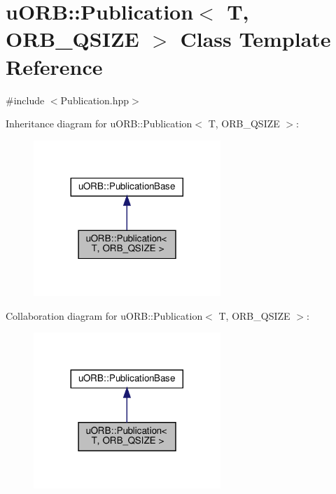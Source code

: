 \hypertarget{classuORB_1_1Publication}{}\section{u\+O\+RB\+:\+:Publication$<$ T, O\+R\+B\+\_\+\+Q\+S\+I\+ZE $>$ Class Template Reference}
\label{classuORB_1_1Publication}


{\ttfamily \#include $<$Publication.\+hpp$>$}



Inheritance diagram for u\+O\+RB\+:\+:Publication$<$ T, O\+R\+B\+\_\+\+Q\+S\+I\+ZE $>$\+:\nopagebreak
\begin{figure}[H]
\begin{center}
\leavevmode
\includegraphics[width=200pt]{d0/d46/classuORB_1_1Publication__inherit__graph}
\end{center}
\end{figure}


Collaboration diagram for u\+O\+RB\+:\+:Publication$<$ T, O\+R\+B\+\_\+\+Q\+S\+I\+ZE $>$\+:\nopagebreak
\begin{figure}[H]
\begin{center}
\leavevmode
\includegraphics[width=200pt]{dd/d69/classuORB_1_1Publication__coll__graph}
\end{center}
\end{figure}
